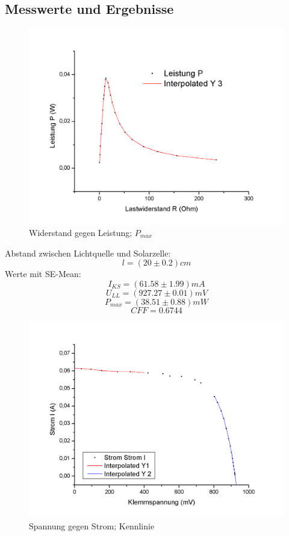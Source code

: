 \documentclass[12pt,a4paper]{article}
\begin{document}
\subsection{Messwerte und Ergebnisse}
\begin{figure}[H]
	\centering
	\includegraphics[scale=0.6]{./figure/solarzelle_pmax.png}
	\caption{Widerstand gegen Leistung; $P_{max}$}
	\label{fig:solarzelle_leistung}
\end{figure}
\begin{multicols}{2}
\noindent
Abstand zwischen Lichtquelle und Solarzelle:
$$l = (20\pm 0.2)cm$$
Werte mit SE-Mean:
$$I_{KS} = (61.58 \pm 1.99) mA$$
$$U_{LL} = (927.27 \pm 0.01) mV$$
$$P_{max} = (38.51 \pm 0.88) mW$$
$$CFF = 0.6744$$

\end{multicols}
\begin{figure}[H]
	\centering
	\includegraphics[scale=0.6]{./figure/solarzelle_strom_spannung.png}
	\caption{Spannung gegen Strom; Kennlinie}
	\label{fig:solarzelle_strom_spannung}
\end{figure}
\end{document}
